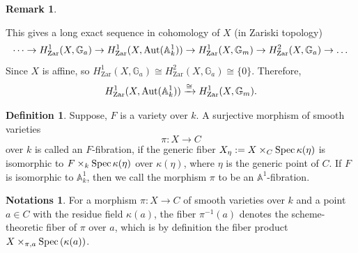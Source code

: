 \documentclass[11pt, reqno]{amsart}
\theoremstyle{plain}
\theoremstyle{definition}
\newtheorem{remark}[thm]{Remark}
\newtheorem{notation}[thm]{Notations}
\newtheorem{definition}[thm]{Definition}
\newcommand{\Aut}{{\rm Aut}}
\newcommand{\Spec}{{\rm Spec \,}}
\newcommand{\A}{{\mathbb A}}
\begin{document}
\begin{remark}
\begin{enumerate}
		This gives a long exact sequence in cohomology of $X$ (in Zariski topology)
		$$\dots \rightarrow H^1_{\text{Zar}}(X, \mathbb{G}_a) \rightarrow H^1_{\text{Zar}}(X, \Aut(\A^1_k)) \rightarrow H^1_{\text{Zar}}(X, \mathbb{G}_m) \rightarrow 
H^2_{\text{Zar}}(X, \mathbb{G}_a) \rightarrow 
\dots$$
        Since $X$ is affine, so 
        $H^1_{\text{Zar}}(X, \mathbb{G}_a) \cong H^2_{\text{Zar}}(X, \mathbb{G}_a) \cong \{0\}$. Therefore,
        $$H^1_{\text{Zar}}(X, \Aut(\A^1_k)) \xrightarrow{\cong} H^1_{\text{Zar}}(X, \mathbb{G}_m).$$
	    \end{enumerate}
	\end{remark}
\begin{definition} \cite[Definition 2.1.1]{masuda} \label{a1 fibration definition}
Suppose, $F$ is a variety over $k$. A surjective morphism of smooth varieties 
        $$\pi: X \to C$$ 
   over $k$ is called an $F$-fibration, if the generic fiber $X_\eta := X\times_C \Spec \kappa(\eta)$ is isomorphic to $F \times_k \Spec \kappa(\eta)$ over $\kappa(\eta)$,
where $\eta$ is the generic point of $C$. If $F$ is isomorphic to $\A^1_k$, then we call the morphism $\pi$ to be an $\A^1$-fibration. 
	\end{definition}
\begin{notation}
For a morphism $\pi: X \to C$ of smooth varieties over $k$ and a point $a \in C$ with the residue field $\kappa(a)$, the fiber $\pi^{-1}(a)$ denotes the scheme-theoretic fiber of $\pi$ over $a$, which is by definition the fiber product $X \times_{\pi, a} \Spec (\kappa(a))$.
\end{notation}	
\end{document}
